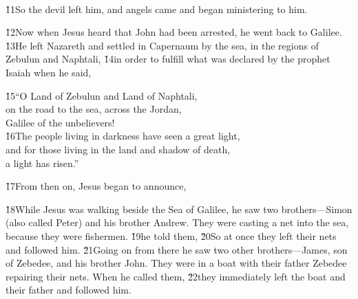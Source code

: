 \begin{poetry}
\poeml {} \\
\poemll    {}
\end{poetry}

\v{11}So the devil left him, and angels came and began ministering to him.

\v{12}Now when Jesus heard that John had been arrested, he went back to Galilee. \v{13}He left Nazareth and settled in Capernaum by the sea, in the regions of Zebulun and Naphtali, \v{14}in order to fulfill what was declared by the prophet Isaiah when he said,

\begin{poetry}
\poeml \v{15}``O Land of Zebulun and Land of Naphtali, \\
\poemll    on the road to the sea, across the Jordan, \\
\poemlll       Galilee of the unbelievers! \\
\poeml \v{16}The people living in darkness have seen a great light, \\
\poemll    and for those living in the land and shadow of death, \\
\poemlll       a light has risen.''
\end{poetry}

\v{17}From then on, Jesus began to announce, 

\v{18}While Jesus was walking beside the Sea of Galilee, he saw two brothers---Simon (also called Peter) and his brother Andrew. They were casting a net into the sea, because they were fishermen. \v{19}he told them, \v{20}So at once they left their nets and followed him. \v{21}Going on from there he saw two other brothers---James, son of Zebedee, and his brother John. They were in a boat with their father Zebedee repairing their nets. When he called them, \v{22}they immediately left the boat and their father and followed him.

